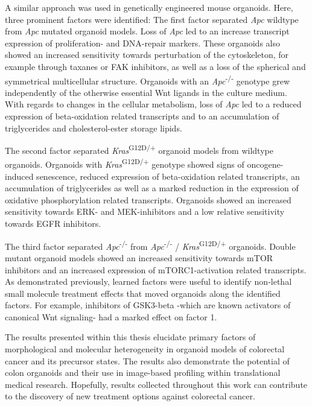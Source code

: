 A similar approach was used in genetically engineered mouse organoids. Here, three prominent factors were identified: The first factor separated \textit{Apc} wildtype from \textit{Apc} mutated organoid models. Loss of \textit{Apc} led to an increase transcript expression of proliferation- and DNA-repair markers. These organoids also showed an increased sensitivity towards perturbation of the cytoskeleton, for example through taxanes or FAK inhibitors, as well as a loss of the spherical and symmetrical multicellular structure. Organoids with an \textit{Apc}\textsuperscript{-/-} genotype grew independently of the otherwise essential Wnt ligands in the culture medium. With regards to changes in the cellular metabolism, loss of \textit{Apc} led to a reduced expression of beta-oxidation related transcripts and to an accumulation of triglycerides and cholesterol-ester storage lipids.
\bigbreak

The second factor separated \textit{Kras}\textsuperscript{G12D/+} organoid models from wildtype organoids. Organoids with \textit{Kras}\textsuperscript{G12D/+} genotype showed signs of oncogene-induced senescence, reduced expression of beta-oxidation related transcripts, an accumulation of triglycerides as well as a marked reduction in the expression of oxidative phosphorylation related transcripts. Organoids showed an increased sensitivity towards ERK- and MEK-inhibitors and a low relative sensitivity towards EGFR inhibitors. 
\bigbreak

The third factor separated \textit{Apc}\textsuperscript{-/-} from \textit{Apc}\textsuperscript{-/-} / \textit{Kras}\textsuperscript{G12D/+} organoids. Double mutant organoid models showed an increased sensitivity towards mTOR inhibitors and an increased expression of mTORC1-activation related transcripts. As demonstrated previously, learned factors were useful to identify non-lethal small molecule treatment effects that moved organoids along the identified factors. For example, inhibitors of GSK3-beta -which are known activators of canonical Wnt signaling- had a marked effect on factor 1. 
\bigbreak

The results presented within this thesis elucidate primary factors of morphological and molecular heterogeneity in organoid models of colorectal cancer and its precursor states. The results also demonstrate the potential of colon organoids and their use in image-based profiling within translational medical research. Hopefully, results collected throughout this work can contribute to the discovery of new treatment options against colorectal cancer. 
